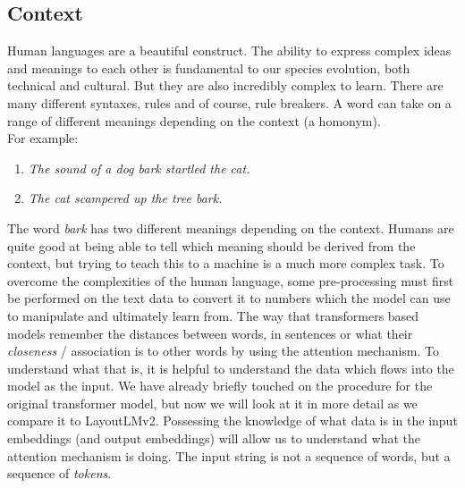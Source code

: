 \subsection{Context}
\label{sec:context}
Human languages are a beautiful construct. The ability to express complex ideas and meanings to each other is fundamental
to our species evolution, both technical and cultural. But they are also incredibly complex to learn. There are many different syntaxes, rules and
of course, rule breakers. A word can take on a range of different meanings depending on the context (a homonym). \\
For example:
\begin{enumerate}
	\item \emph{The sound of a dog bark startled the cat.}
	\item \emph{The cat scampered up the tree bark.}
\end{enumerate}
The word \emph{bark} has two different meanings depending on the context. Humans are quite good at being able to tell which meaning
should be derived from the context, but trying to teach this to a machine is a much more complex task.
\bigbreak
To overcome the complexities of the human language, some pre-processing must first be performed on the text data to convert it to
numbers which the model can use to manipulate and ultimately learn from. The way that transformers based models remember the
distances between words, in sentences or what their \emph{closeness} / association is to other words by using the attention mechanism.
\bigbreak
To understand what that is, it is helpful to understand the data which flows into the model as the input. We have already
briefly touched on the  procedure for the original transformer model, but now we will look at it in more detail
as we compare it to LayoutLMv2. Possessing the knowledge of what data is in the input embeddings (and output embeddings) will allow us to
understand what the attention mechanism is doing.
\bigbreak
The input string is not a sequence of words, but a sequence of \emph{tokens}.

